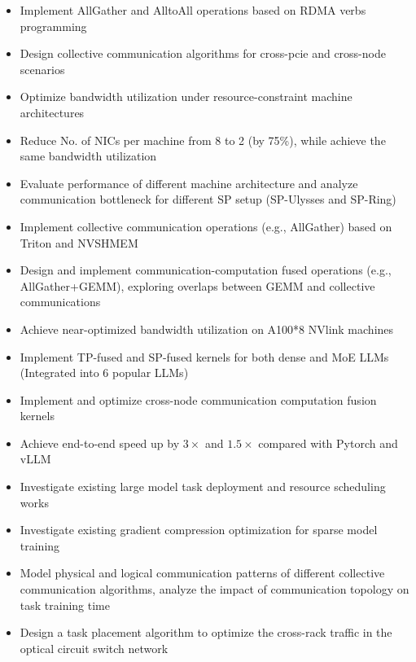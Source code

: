 \documentclass{resume}
\begin{document}
\begin{itemize}
  \item Implement AllGather and AlltoAll operations based on RDMA verbs programming
  \item Design collective communication algorithms for cross-pcie and cross-node scenarios 
  \item Optimize bandwidth utilization under resource-constraint machine architectures 
  \item Reduce No. of NICs per machine from 8 to 2 (by 75\%), while achieve the same bandwidth utilization
  \item Evaluate performance of different machine architecture and analyze communication bottleneck for different SP setup (SP-Ulysses and SP-Ring)
\end{itemize}

\begin{itemize}
  \item Implement collective communication operations (e.g., AllGather) based on Triton and NVSHMEM
  \item Design and implement communication-computation fused operations (e.g., AllGather+GEMM), exploring overlaps between GEMM and collective communications
  \item Achieve near-optimized bandwidth utilization on A100*8 NVlink machines
  \item Implement TP-fused and SP-fused kernels for both dense and MoE LLMs (Integrated into 6 popular LLMs)
  \item Implement and optimize cross-node communication computation fusion kernels
  \item Achieve end-to-end speed up by $3\times$ and $1.5\times$ compared with Pytorch and vLLM
\end{itemize}

\begin{itemize}
  \item Investigate existing large model task deployment and resource scheduling works
  \item Investigate existing gradient compression optimization for sparse model training
  \item Model physical and logical communication patterns of different collective communication algorithms, analyze the impact of communication topology on task training time
  \item Design a task placement algorithm to optimize the cross-rack traffic in the optical circuit switch network
\end{itemize}
\end{document}
